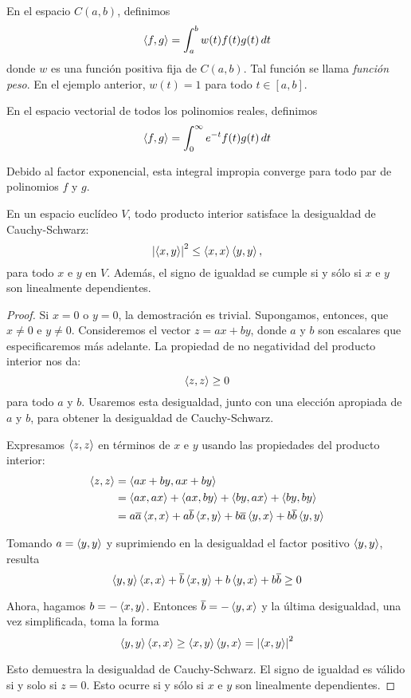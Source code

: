 \documentclass[a4paper,12pt]{article}
\begin{document}
\begin{example}
    En el espacio $C(a, b)$, definimos
    $$\left\langle f,g\right\rangle = \int_a^b w(t) f(t) g(t) \, dt$$
    donde $w$ es una función positiva fija de $C(a, b)$. Tal función se llama {\it función peso}. En el ejemplo anterior, $w(t) = 1$ para todo $t \in [a, b]$.
\end{example}

\begin{example}
    En el espacio vectorial de todos los polinomios reales, definimos
    $$\left\langle f,g\right\rangle = \int_0^\infty e^{-t} f(t) g(t) \, dt$$

    Debido al factor exponencial, esta integral impropia converge para todo par de polinomios $f$ y $g$.
\end{example}

\begin{theorem}
    En un espacio euclídeo $V$, todo producto interior satisface la desigualdad de Cauchy-Schwarz:
    $$\left| \left\langle x,y\right\rangle\right|^2 \leq \left\langle x,x\right\rangle\left\langle y,y\right\rangle,$$
    para todo $x$ e $y$ en $V$. Además, el signo de igualdad se cumple si y sólo si $x$ e $y$ son linealmente dependientes.
\end{theorem}

\begin{proof}
    Si $x = 0$ o $y = 0$, la demostración es trivial. Supongamos, entonces, que $x \neq 0$ e $y \neq 0$. Consideremos el vector $z = a x + b y$, donde $a$ y $b$ son escalares que especificaremos más adelante. La propiedad de no negatividad del producto interior nos da:
    $$\left\langle z,z\right\rangle \geq 0$$
    para todo $a$ y $b$. Usaremos esta desigualdad, junto con una elección apropiada de $a$ y $b$, para obtener la desigualdad de Cauchy-Schwarz.

    Expresamos $\left\langle z,z\right\rangle$ en términos de $x$ e $y$ usando las propiedades del producto interior:
    \begin{align*}
        \left\langle z,z\right\rangle & = \left\langle a x + b y,a x + b y\right\rangle \\
                  & = \left\langle a x,a x\right\rangle + \left\langle a x,b y\right\rangle + \left\langle b y,a x\right\rangle + \left\langle b y,b y\right\rangle \\
                  & = a \overline{a} \left\langle x,x\right\rangle + a \overline{b} \left\langle x,y\right\rangle + b \overline{a} \left\langle y,x\right\rangle + b \overline{b} \left\langle y,y\right\rangle
    \end{align*}

    Tomando $a=\left\langle y,y\right\rangle$ y suprimiendo en la desigualdad el factor positivo $\left\langle y,y\right\rangle$, resulta
    $$\left\langle y,y\right\rangle\left\langle x,x\right\rangle + \overline{b}\left\langle x,y\right\rangle + b\left\langle y,x\right\rangle + b\overline{b} \geq 0$$

    Ahora, hagamos $b=-\left\langle x,y\right\rangle$. Entonces $\overline{b}=-\left\langle y,x\right\rangle$ y la última desigualdad, una vez simplificada, toma la forma
    $$\left\langle y,y\right\rangle\left\langle x,x\right\rangle\geq\left\langle x,y\right\rangle\left\langle y,x\right\rangle=\left| \left\langle x,y\right\rangle\right|^2$$

    Esto demuestra la desigualdad de Cauchy-Schwarz. El signo de igualdad es válido si y solo si $z=0$. Esto ocurre si y sólo si $x$ e $y$ son linealmente dependientes.
\end{proof}
\end{document}
